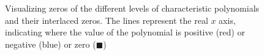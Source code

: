 \documentclass{article}
\begin{document}
\begin{figure}
 	
 	\caption{
 		Visualizing zeros of the different levels of characteristic polynomials and their interlaced zeros. The lines represent the real $x$ axis, indicating where the value of the polynomial is {\color{red}positive (red)} or {\color{blue}negative (blue)} or zero ($\blacksquare$)
 	}\label{fig:charpoly-zero}
 \end{figure}
\FloatBarrier
\newpage
\printbibliography
\end{document}
